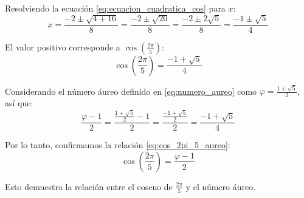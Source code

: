 Resolviendo la ecuación \eqref{eq:ecuacion_cuadratica_cos} para $x$:
\begin{equation}\label{eq:solucion_cuadratica}
x = \frac{-2 \pm \sqrt{4 + 16}}{8} = \frac{-2 \pm \sqrt{20}}{8} = \frac{-2 \pm 2\sqrt{5}}{8} = \frac{-1 \pm \sqrt{5}}{4}
\end{equation}

El valor positivo corresponde a $\cos\left(\frac{2\pi}{5}\right)$:
\begin{equation}\label{eq:cos_2pi_5_final}
\cos\left(\frac{2\pi}{5}\right) = \frac{-1 + \sqrt{5}}{4}
\end{equation}

Considerando el número áureo definido en \eqref{eq:numero_aureo} como $\varphi = \frac{1 + \sqrt{5}}{2}$, así que:
\begin{equation}\label{eq:relacion_aureo_cos}
\frac{\varphi - 1}{2} = \frac{\frac{1 + \sqrt{5}}{2} - 1}{2} = \frac{\frac{-1 + \sqrt{5}}{2}}{2} = \frac{-1 + \sqrt{5}}{4}
\end{equation}

Por lo tanto, confirmamos la relación \eqref{eq:cos_2pi_5_aureo}:
\begin{equation}\label{eq:cos_aureo_confirmado}
\cos\left(\frac{2\pi}{5}\right) = \frac{\varphi - 1}{2}
\end{equation}

Esto demuestra la relación entre el coseno de $\frac{2\pi}{5}$ y el número áureo.
